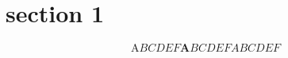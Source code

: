 \documentclass[12pt]{article}
\begin{document}
    \section{section 1}
    \[
    \mathrm ABCDEF \mathbf ABCDEF \mathit ABCDEF
    \]
\end{document}
